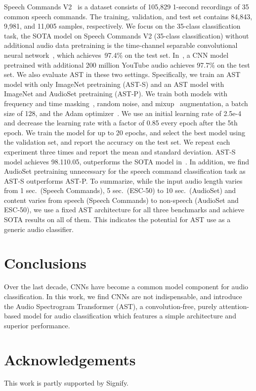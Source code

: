 \documentclass[a4paper]{article}
\begin{document}
Speech Commands V2~\cite{warden2018speech} is a dataset consists of 105,829 1-second recordings of 35 common speech commands. The training, validation, and test set contains 84,843, 9,981, and 11,005 samples, respectively. We focus on the 35-class classification task, the SOTA model on Speech Commands V2 (35-class classification) without additional audio data pretraining is the time-channel separable convolutional neural network~\cite{majumdar2020matchboxnet}, which achieves~97.4\% on the test set. In~\cite{lin2020training}, a CNN model pretrained with additional 200 million YouTube audio achieves 97.7\% on the test set. We also evaluate AST in these two settings. Specifically, we train an AST model with only ImageNet pretraining (AST-S) and an AST model with ImageNet and AudioSet pretraining (AST-P). We train both models with frequency and time masking~\cite{park2019specaugment}, random noise, and mixup~\cite{tokozume2018learning} augmentation, a batch size of 128, and the Adam optimizer~\cite{kingma2015adam}. We use an initial learning rate of 2.5e-4 and decrease the learning rate with a factor of 0.85 every epoch after the 5th epoch. We train the model for up to 20 epochs, and select the best model using the validation set, and report the accuracy on the test set. We repeat each experiment three times and report the mean and standard deviation. AST-S model achieves 98.110.05, outperforms the SOTA model in~\cite{rybakov2020streaming}. In addition, we find AudioSet pretraining unnecessary for the speech command classification task as AST-S outperforms AST-P. 
To summarize, while the input audio length varies from 1 sec.~(Speech Commands), 5 sec.~(ESC-50) to 10 sec.~(AudioSet) and content varies from speech (Speech Commands) to non-speech (AudioSet and ESC-50), we use a fixed AST architecture for all three benchmarks and achieve SOTA results on all of them. This indicates the  potential for AST use as a generic audio classifier.


\section{Conclusions}

Over the last decade, CNNs have become a common model component for audio classification. In this work, we find CNNs are not indispensable, and introduce the Audio Spectrogram Transformer (AST), a convolution-free, purely attention-based model for audio classification which features a simple architecture and superior performance.




\section{Acknowledgements} This work is partly supported by Signify.

\newpage




\end{document}
